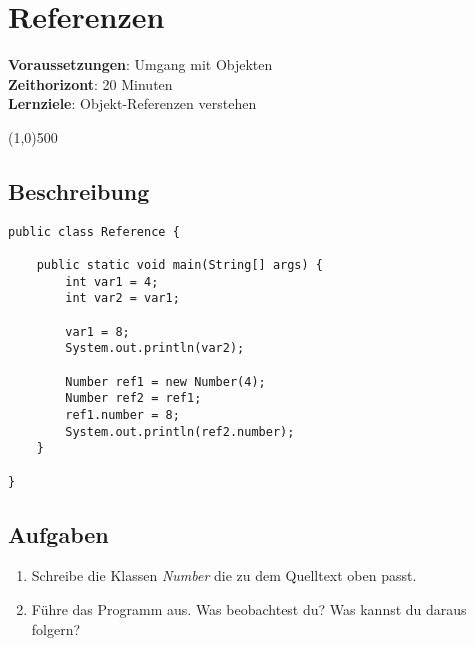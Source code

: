 


\chapter*{Referenzen}

\headingfont
\parbox {\textwidth}{
    \textbf{Voraussetzungen}: Umgang mit Objekten \\
    \textbf{Zeithorizont}: 20 Minuten \\
    \textbf{Lernziele}: Objekt-Referenzen verstehen
}

\normalfont
\begin{center}
\line(1,0){500}
\end{center}
\vspace{1cm}

\section*{Beschreibung}
\begin{lstlisting}
public class Reference {
    
    public static void main(String[] args) {
        int var1 = 4;
        int var2 = var1;
        
        var1 = 8;
        System.out.println(var2);
        
        Number ref1 = new Number(4);
        Number ref2 = ref1;
        ref1.number = 8;
        System.out.println(ref2.number);
    }
    
}

\end{lstlisting}

\section*{Aufgaben}
\begin{enumerate}
     \item Schreibe die Klassen \textit{Number} die zu dem Quelltext oben passt.
     \item Führe das Programm aus. Was beobachtest du? Was kannst du daraus folgern?
\end{enumerate}

